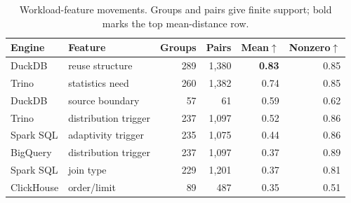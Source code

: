 \begin{table}[t]
\centering
\caption{Workload-feature movements. Groups and pairs give finite support; bold marks the top mean-distance row.}
\label{tab:workload-sensitivity}
\footnotesize
\setlength{\tabcolsep}{2.4pt}
\begin{tabular}{@{}l>{\raggedright\arraybackslash}p{0.92in}rrrr@{}}
\toprule
Engine & Feature & Groups & Pairs & Mean$\uparrow$ & Nonzero$\uparrow$ \\
\midrule
DuckDB & reuse structure & 289 & 1,380 & \textbf{0.83} & 0.85 \\
Trino & statistics need & 260 & 1,382 & 0.74 & 0.85 \\
DuckDB & source boundary & 57 & 61 & 0.59 & 0.62 \\
Trino & distribution trigger & 237 & 1,097 & 0.52 & 0.86 \\
Spark SQL & adaptivity trigger & 235 & 1,075 & 0.44 & 0.86 \\
BigQuery & distribution trigger & 237 & 1,097 & 0.37 & 0.89 \\
Spark SQL & join type & 229 & 1,201 & 0.37 & 0.81 \\
ClickHouse & order/limit & 89 & 487 & 0.35 & 0.51 \\
\bottomrule
\end{tabular}
\end{table}
